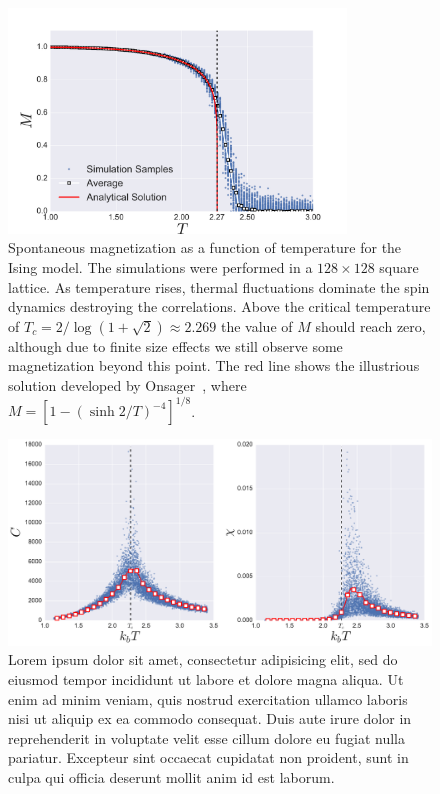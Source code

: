 \begin{figure}
\begin{center}
    \includegraphics[width=0.8\textwidth]{chapters/ch2-crit/figs/ising_phase}
\end{center}
\caption{Spontaneous magnetization as a function of temperature for the Ising
    model. The simulations were performed in a $128\times128$ square lattice.
    As temperature rises, thermal fluctuations dominate the spin dynamics
    destroying the correlations. Above the critical temperature of
    $T_c=2/\log(1+\sqrt{2})\approx 2.269$ the value of $M$ should reach zero,
    although due to finite size effects we still observe some magnetization
    beyond this point. The red line shows the illustrious solution
    developed by Onsager~\cite{Onsager1944}, where
    $M={[1-{(\sinh{2/T})}^{-4}]}^{1/8}$.}
\label{fig:ising_phase}
\end{figure}

\begin{figure}
\begin{center}
    \includegraphics[width=\textwidth]{chapters/ch2-crit/figs/ising_cx}
\end{center}
\caption{Lorem ipsum dolor sit amet, consectetur adipisicing elit, sed do
    eiusmod tempor incididunt ut labore et dolore magna aliqua. Ut enim ad
    minim veniam, quis nostrud exercitation ullamco laboris nisi ut aliquip ex
    ea commodo consequat. Duis aute irure dolor in reprehenderit in voluptate
    velit esse cillum dolore eu fugiat nulla pariatur. Excepteur sint occaecat
    cupidatat non proident, sunt in culpa qui officia deserunt mollit anim id
    est laborum.}
\label{fig:ising_cx}
\end{figure}




